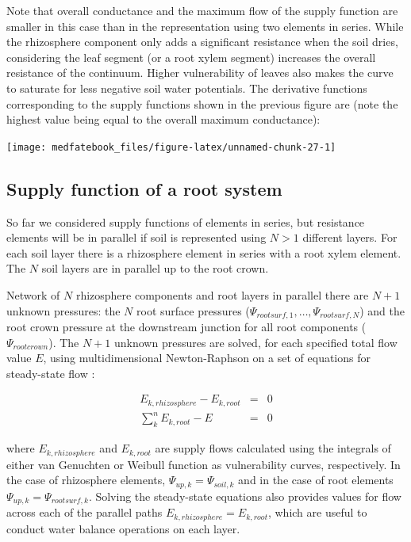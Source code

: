 \documentclass[]{book}
\begin{document}
Note that overall conductance and the maximum flow of the supply
function are smaller in this case than in the representation using two
elements in series. While the rhizosphere component only adds a
significant resistance when the soil dries, considering the leaf segment
(or a root xylem segment) increases the overall resistance of the
continuum. Higher vulnerability of leaves also makes the curve to
saturate for less negative soil water potentials. The derivative
functions corresponding to the supply functions shown in the previous
figure are (note the highest value being equal to the overall maximum
conductance):

\begin{center}\texttt{[image: medfatebook\_files/figure-latex/unnamed-chunk-27-1]} \end{center}

\subsection{Supply function of a root
system}\label{supply-function-of-a-root-system}

So far we considered supply functions of elements in series, but
resistance elements will be in parallel if soil is represented using
\(N>1\) different layers. For each soil layer there is a rhizosphere
element in series with a root xylem element. The \(N\) soil layers are
in parallel up to the root crown.

Network of \(N\) rhizosphere components and root layers in parallel
there are \(N+1\) unknown pressures: the \(N\) root surface pressures
(\(\Psi_{rootsurf,1},\dots,\Psi_{rootsurf,N}\)) and the root crown
pressure at the downstream junction for all root components
(\(\Psi_{rootcrown}\)). The \(N+1\) unknown pressures are solved, for
each specified total flow value \(E\), using multidimensional
Newton-Raphson on a set of equations for steady-state flow
\citep{Sperry2016a}:

\begin{eqnarray}
   E_{k, rhizosphere}-E_{k,root} &=& 0 \\
   \sum_{k}^{n}{E_{k,root}}-E &=& 0
\end{eqnarray}

where \(E_{k, rhizosphere}\) and \(E_{k, root}\) are supply flows
calculated using the integrals of either van Genuchten or Weibull
function as vulnerability curves, respectively. In the case of
rhizosphere elements, \(\Psi_{up,k}=\Psi_{soil,k}\) and in the case of
root elements \(\Psi_{up,k}=\Psi_{rootsurf,k}\). Solving the
steady-state equations also provides values for flow across each of the
parallel paths \(E_{k, rhizosphere} = E_{k, root}\), which are useful to
conduct water balance operations on each layer.
\end{document}
